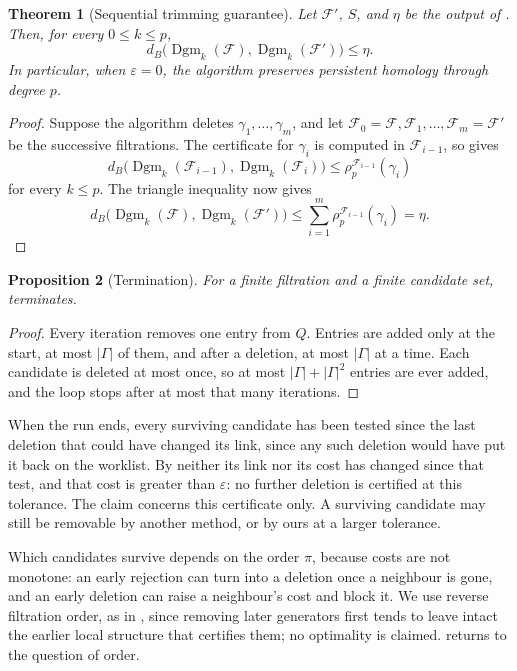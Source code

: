 \documentclass[11pt,letterpaper]{article}
\newtheorem{theorem}{Theorem}[section]
\newtheorem{proposition}[theorem]{Proposition}
\theoremstyle{definition}
\newcommand{\Dgm}{\operatorname{Dgm}}
\newcommand{\eps}{\varepsilon}
\begin{document}
\begin{theorem}[Sequential trimming guarantee]
\label{thm:sequential-trimming}
Let $\mathcal F'$, $S$, and $\eta$ be the output of
. Then, for every $0\leq k\leq p$,
$$
d_B\bigl(\Dgm_k(\mathcal F),\Dgm_k(\mathcal F')\bigr)
\leq\eta.
$$
In particular, when $\eps=0$, the algorithm preserves persistent homology
through degree $p$.
\end{theorem}

\begin{proof}
Suppose the algorithm deletes $\gamma_1,\ldots,\gamma_m$, and let
$\mathcal F_0=\mathcal F,\mathcal F_1,\ldots,\mathcal F_m=\mathcal F'$ be the
successive filtrations. The certificate for $\gamma_i$ is computed in
$\mathcal F_{i-1}$, so  gives
$$
d_B\bigl(\Dgm_k(\mathcal F_{i-1}),\Dgm_k(\mathcal F_i)\bigr)
\leq\rho_p^{\mathcal F_{i-1}}(\gamma_i)
$$
for every $k\leq p$. The triangle inequality now gives
$$
d_B\bigl(\Dgm_k(\mathcal F),\Dgm_k(\mathcal F')\bigr)
\leq
\sum_{i=1}^m\rho_p^{\mathcal F_{i-1}}(\gamma_i)=\eta.
$$
\end{proof}

\begin{proposition}[Termination]
\label{prop:termination}
For a finite filtration and a finite candidate set,
 terminates.
\end{proposition}

\begin{proof}
Every iteration removes one entry from $Q$. Entries are added only at the
start, at most $|\Gamma|$ of them, and after a deletion, at most $|\Gamma|$ at
a time. Each candidate is deleted at most once, so at most
$|\Gamma|+|\Gamma|^2$ entries are ever added, and the loop stops after at most
that many iterations.
\end{proof}

When the run ends, every surviving candidate has been tested since the last
deletion that could have changed its link, since any such deletion would have
put it back on the worklist. By  neither its link nor its
cost has changed since that test, and that cost is greater than $\eps$: no
further deletion is certified at this tolerance. The claim concerns this
certificate only. A surviving candidate may still be removable by another
method, or by ours at a larger tolerance.

Which candidates survive depends on the order $\pi$, because costs are not
monotone: an early rejection can turn into a deletion once a neighbour is gone,
and an early deletion can raise a neighbour's cost and block it. We use reverse filtration order, as in \cite{GlissePritam2022}, since removing
later generators first tends to leave intact the earlier local structure that
certifies them; no optimality is claimed.  returns to the question of order.
\end{document}
